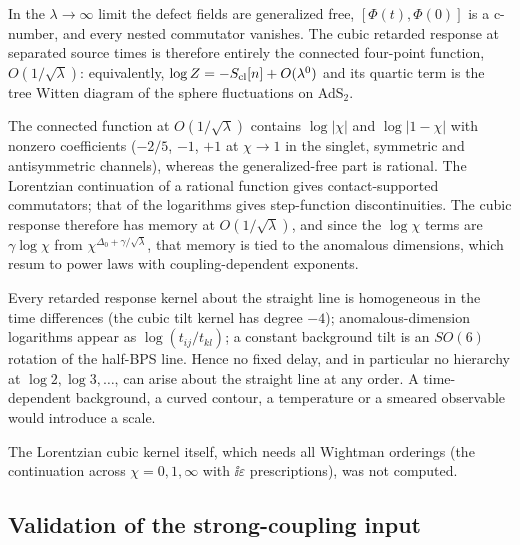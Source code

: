 \begin{proposition}
\label{prop:gff}
In the $\lambda\to\infty$ limit the defect fields are generalized free, $[\Phi(t),\Phi(0)]$ is a c-number, and every
nested commutator vanishes. The cubic retarded response at separated source times is therefore entirely the connected
four-point function, $O(1/\sqrt\lambda)$: equivalently, $\log Z=-S_{\rm cl}[n]+O(\lambda^0)$ and its quartic term is
the tree Witten diagram of the sphere fluctuations on AdS$_2$.
\end{proposition}

\begin{proposition}[memory]
\label{prop:memory}
The connected function at $O(1/\sqrt\lambda)$ contains $\log|\chi|$ and $\log|1-\chi|$ with nonzero coefficients
($-2/5$, $-1$, $+1$ at $\chi\to1$ in the singlet, symmetric and antisymmetric channels), whereas the generalized-free
part is rational. The Lorentzian continuation of a rational function gives contact-supported commutators; that of
the logarithms gives step-function discontinuities. The cubic response therefore has memory at $O(1/\sqrt\lambda)$,
and since the $\log\chi$ terms are $\gamma\log\chi$ from $\chi^{\Delta_0+\gamma/\sqrt\lambda}$, that memory is tied to
the anomalous dimensions, which resum to power laws with coupling-dependent exponents.
\end{proposition}

\begin{proposition}[no scale]
\label{prop:noscale}
Every retarded response kernel about the straight line is homogeneous in the time differences (the cubic tilt kernel
has degree $-4$); anomalous-dimension logarithms appear as $\log(t_{ij}/t_{kl})$; a constant background tilt is an
$SO(6)$ rotation of the half-BPS line. Hence no fixed delay, and in particular no hierarchy at $\log 2,\log3,\dots$,
can arise about the straight line at any order. A time-dependent background, a curved contour, a temperature or a
smeared observable would introduce a scale.
\end{proposition}

The Lorentzian cubic kernel itself, which needs all Wightman orderings (the continuation across $\chi=0,1,\infty$ with
$\ii\varepsilon$ prescriptions), was not computed.

\subsection{Validation of the strong-coupling input}

